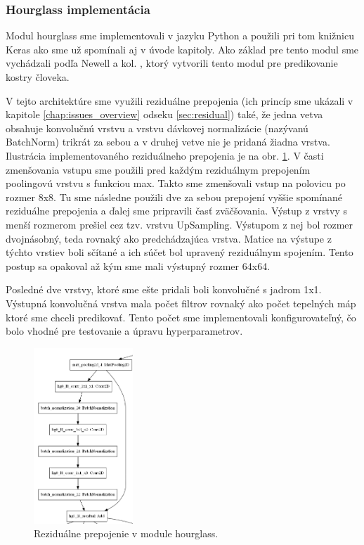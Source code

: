 \subsubsection{Hourglass implementácia}
Modul hourglass sme implementovali v jazyku Python a použili pri tom knižnicu Keras ako sme už spomínali aj v úvode kapitoly. Ako základ pre tento modul sme vychádzali podľa Newell a kol. \cite{DBLP:journals/corr/NewellYD16}, ktorý vytvorili tento modul pre predikovanie kostry človeka. 

V tejto architektúre sme využili reziduálne prepojenia (ich princíp sme ukázali v kapitole \ref{chap:issues_overview} odseku \ref{sec:residual}) také, že jedna vetva obsahuje konvolučnú vrstvu a vrstvu dávkovej normalizácie (nazývanú BatchNorm) trikrát za sebou a v druhej vetve nie je pridaná žiadna vrstva. Ilustrácia implementovaného reziduálneho prepojenia je na obr. \ref{img:42residual}. V časti zmenšovania vstupu sme použili pred každým reziduálnym prepojením poolingovú vrstvu s funkciou max. Takto sme zmenšovali vstup na polovicu po rozmer 8x8. Tu sme následne použili dve za sebou prepojení vyššie spomínané reziduálne prepojenia a ďalej sme pripravili časť zväčšovania. Výstup z vrstvy s menší rozmerom prešiel cez tzv. vrstvu UpSampling. Výstupom z nej bol rozmer dvojnásobný, teda rovnaký ako predchádzajúca vrstva. Matice na výstupe z týchto vrstiev boli sčítané a ich súčet bol upravený reziduálnym spojením. Tento postup sa opakoval až kým sme mali výstupný rozmer 64x64.

Posledné dve vrstvy, ktoré sme ešte pridali boli konvolučné s jadrom 1x1. Výstupná konvolučná vrstva mala počet filtrov rovnaký ako počet tepelných máp ktoré sme chceli predikovať. Tento počet sme implementovali konfigurovateľný, čo bolo vhodné pre testovanie a úpravu hyperparametrov. 

\begin{figure}[H]
	\begin{center}
		\includegraphics[height=250px]{images/42residual.png}
		\caption{Reziduálne prepojenie v module hourglass.}
		\label{img:42residual}
	\end{center}
\end{figure}

